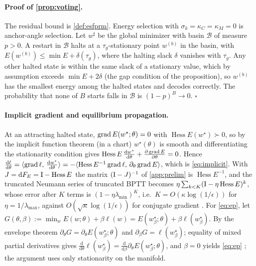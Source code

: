 \paragraph{Proof of \cref{prop:voting}.}
The residual bound is \cref{def:esfprm}. Energy selection with $\sigma_k=\kappa_C=\kappa_M=0$ is
anchor-angle selection. Let $w^\sharp$ be the global minimizer with basin $\mathcal B$ of measure
$p>0$. A restart in $\mathcal B$ halts at a $\tau_g$-stationary point $w^{(b)}$ in the basin, with
$E(w^{(b)})\le\min E+\delta(\tau_g)$, where the halting slack $\delta$ vanishes with $\tau_g$. Any other
halted state is within the same slack of a stationary value, which by assumption exceeds $\min E+2\delta$
(the gap condition of the proposition),
so $w^{(b)}$ has the smallest energy among the halted states and decodes correctly. The probability
that none of $B$ starts falls in $\mathcal B$ is $(1-p)^B\to0$. \hfill$\square$

\paragraph{Implicit gradient and equilibrium propagation.}
At an attracting halted state, $\operatorname{grad} E(w^\star;\theta)=0$ with $\operatorname{Hess}E(w^\star)\succ0$,
so by the implicit function theorem (in a chart) $w^\star(\theta)$ is smooth and differentiating the
stationarity condition gives $\operatorname{Hess}E\,\frac{\mathrm dw^\star}{\mathrm d\theta}+\frac{\partial\operatorname{grad} E}{\partial\theta}=0$.
Hence $\frac{\mathrm d\ell}{\mathrm d\theta}=\langle \operatorname{grad}\ell,\, \frac{\mathrm dw^\star}{\mathrm d\theta}\rangle=-\langle \operatorname{Hess}E^{-1}\operatorname{grad}\ell,\, \partial_\theta\operatorname{grad} E\rangle$,
which is \eqref{eq:implicit}. With $J=\mathrm dF_E=\mathrm{I}-\operatorname{Hess}E$ the matrix
$(\mathrm{I}-J)^{-1}$ of \cref{app:prelim} is $\operatorname{Hess}E^{-1}$, and the truncated Neumann series
of truncated BPTT becomes $\eta\sum_{k<K}(\mathrm{I}-\eta\operatorname{Hess}E)^k$, whose error after $K$
terms is $(1-\eta\lambda_{\min})^K$, i.e.\ $K=O(\kappa\log(1/\epsilon))$ for $\eta=1/\lambda_{\max}$,
against $O(\sqrt\kappa\log(1/\epsilon))$ for conjugate gradient \citep[Thm.~5.5]{nocedal2006}. For
\eqref{eq:ep}, let $G(\theta,\beta):=\min_wE(w;\theta)+\beta\ell(w)=E(w^\star_\beta;\theta)+\beta\ell(w^\star_\beta)$.
By the envelope theorem $\partial_\theta G=\partial_\theta E(w^\star_\beta;\theta)$ and
$\partial_\beta G=\ell(w^\star_\beta)$; equality of mixed partial derivatives gives
$\frac{\mathrm d}{\mathrm d\theta}\ell(w^\star_\beta)=\frac{\mathrm d}{\mathrm d\beta}\partial_\theta E(w^\star_\beta;\theta)$,
and $\beta=0$ yields \eqref{eq:ep} \citep{scellier2017ep}; the argument uses only stationarity on the
manifold.

